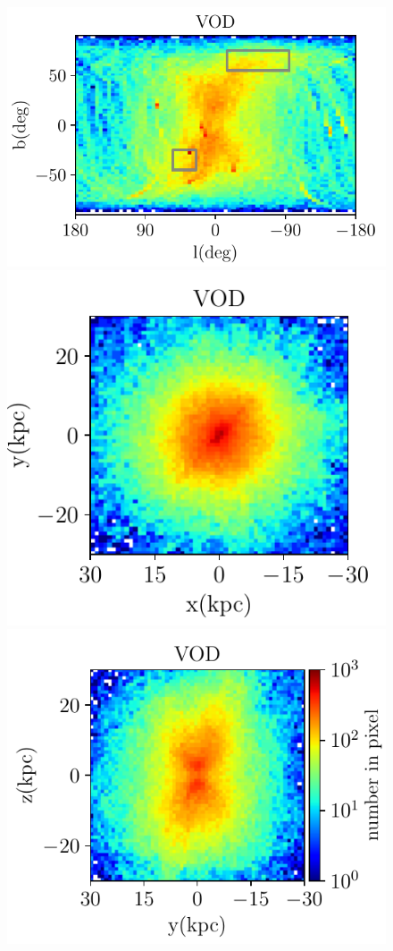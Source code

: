 \documentclass[fleqn,usenatbib]{mnras}
\begin{document}
\begin{figure}
	     	     	     	     \includegraphics[scale=0.52]{VOD_orbits_8Gyrs_lb_defaultmass.pdf}
	     	     \includegraphics[scale=0.52]{VOD_orbits_8Gyrs_xy_defaultmass.pdf}
	     	     	     \includegraphics[scale=0.52]{VOD_orbits_8Gyrs_yz_defaultmass.pdf}

\end{figure}
\end{document}
